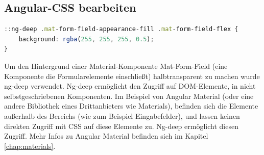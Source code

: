 \subsection{Angular-CSS bearbeiten}
\begin{lstlisting}[language=TypeScript, caption=Semi-Transperentes Eingabefeld, label=lst:Ng-deep]
::ng-deep .mat-form-field-appearance-fill .mat-form-field-flex {  
    background: rgba(255, 255, 255, 0.5);
}
\end{lstlisting}
Um den Hintergrund einer Material-Komponente Mat-Form-Field (eine Komponente die Formularelemente
einschließt) halbtransparent zu machen wurde ng-deep verwendet.
\newline
\newline
Ng-deep ermöglicht den Zugriff auf DOM-Elemente, in nicht selbstgeschriebenen Komponenten.
Im Beispiel von Angular Material (oder eine andere Bibliothek eines Drittanbieters wie Materials), befinden 
sich die Elemente außerhalb des Bereichs (wie zum Beispiel Eingabefelder), und lassen keinen direkten Zugriff mit CSS auf diese Elemente 
zu. Ng-deep ermöglicht diesen Zugriff. Mehr Infos zu Angular Material befinden sich im Kapitel \ref{chap:materials}.

